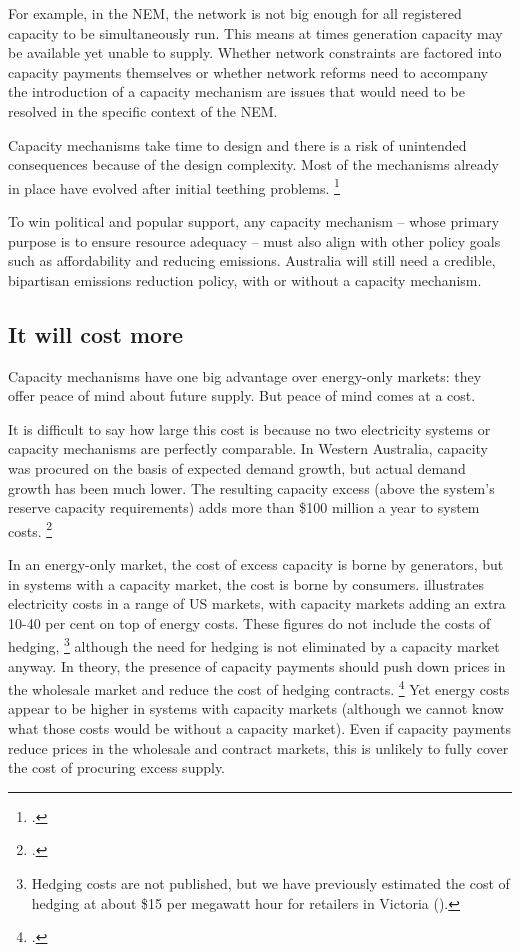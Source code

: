 \documentclass[FrontPage]{grattan}
\begin{document}
For example, in the NEM, the network is not big enough for all registered capacity to be simultaneously run. This means at times generation capacity may be available yet unable to supply. Whether network constraints are factored into capacity payments themselves or whether network reforms need to accompany the introduction of a capacity mechanism are issues that would need to be resolved in the specific context of the NEM\@.

Capacity mechanisms take time to design and there is a risk of unintended consequences because of the design complexity. Most of the mechanisms already in place have evolved after initial teething problems.%
\footcite{CIGRE2016CapacityMechanisms}
\CenturyFootnote

To win political and popular support, any capacity mechanism -- whose primary purpose is to ensure resource adequacy -- must also align with other policy goals such as affordability and reducing emissions. Australia will still need a credible, bipartisan emissions reduction policy, with or without a capacity mechanism.


\subsection{It will cost more}\label{subsec:a-capacity-mechanism-will-cost-more}
Capacity mechanisms have one big advantage over energy-only markets: they offer peace of mind about future supply. But peace of mind comes at a cost.

It is difficult to say how large this cost is because no two electricity systems or capacity mechanisms are perfectly comparable. In Western Australia, capacity was procured on the basis of expected demand growth, but actual demand growth has been much lower. The resulting capacity excess (above the system's reserve capacity requirements) adds more than \$100 million a year to system costs.%
\footcite{WAFinance2016CapacityMechanismReview}

In an energy-only market, the cost of excess capacity is borne by generators, but in systems with a capacity market, the cost is borne by consumers.  illustrates electricity costs in a range of US markets, with capacity markets adding an extra 10-40 per cent on top of energy costs. These figures do not include the costs of hedging,%
\footnote{Hedging costs are not published, but we have previously estimated the cost of hedging at about \$15 per megawatt hour for retailers in Victoria (\textcite{WoodBlowers-2017-Retail-competition}).}
although the need for hedging is not eliminated by a capacity market anyway.
In theory, the presence of capacity payments should push down prices in the wholesale market and reduce the cost of hedging contracts.%
\footcite{Cramton2013CapacityMarketFundamentals}
Yet energy costs appear to be higher in systems with capacity markets (although we cannot know what those costs would be without a capacity market). Even if capacity payments reduce prices in the wholesale and contract markets, this is unlikely to fully cover the cost of procuring excess supply.
\end{document}
